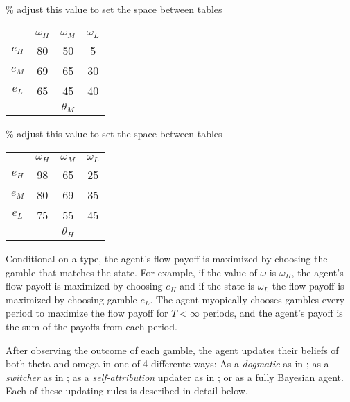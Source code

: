 \documentclass[
  12pt,
]{article}
\begin{document}
\% adjust this value to set the space between tables

\begin{tabular}{ c|c|c|c|}
  
  \multicolumn{1}{c}{} & \multicolumn{1}{c}{$\omega_H$} & \multicolumn{1}{c}{$\omega_M$} & \multicolumn{1}{c}{$\omega_L$}\\
  \cline{2-4}
  $e_H$ & 80 & 50 & 5 \\
  \cline{2-4}
  $e_M$ & 69 & 65 & 30 \\
  \cline{2-4}
  $e_L$ & 65 & 45 & 40 \\
  \cline{2-4}
  \multicolumn{1}{c}{} & \multicolumn{1}{c}{} & \multicolumn{1}{c}{$\theta_M$} & \multicolumn{1}{c}{}\\
\end{tabular}
\hspace{.3cm}

\% adjust this value to set the space between tables

\begin{tabular}{ c|c|c|c|}
  
  \multicolumn{1}{c}{} & \multicolumn{1}{c}{$\omega_H$} & \multicolumn{1}{c}{$\omega_M$} & \multicolumn{1}{c}{$\omega_L$}\\
  \cline{2-4}
  $e_H$ & 98 & 65 & 25 \\
  \cline{2-4}
  $e_M$ & 80 & 69 & 35 \\
  \cline{2-4}
  $e_L$ & 75 & 55 & 45 \\
  \cline{2-4}
  \multicolumn{1}{c}{} & \multicolumn{1}{c}{} & \multicolumn{1}{c}{$\theta_H$} & \multicolumn{1}{c}{}\\
\end{tabular}

Conditional on a type, the agent's flow payoff is maximized by choosing
the gamble that matches the state. For example, if the value of
\(\omega\) is \(\omega_H\), the agent's flow payoff is maximized by
choosing \(e_H\) and if the state is \(\omega_L\) the flow payoff is
maximized by choosing gamble \(e_L\). The agent myopically chooses
gambles every period to maximize the flow payoff for \(T<\infty\)
periods, and the agent's payoff is the sum of the payoffs from each
period.

After observing the outcome of each gamble, the agent updates their
beliefs of both theta and omega in one of 4 differente ways: As a
\emph{dogmatic} as in \citet{Heidhues2018} ; as a \emph{switcher} as in
\citet{Ba2023} ; as a \emph{self-attribution} updater as in
\citet{Coutts2020}; or as a fully Bayesian agent. Each of these updating
rules is described in detail below.
\end{document}
